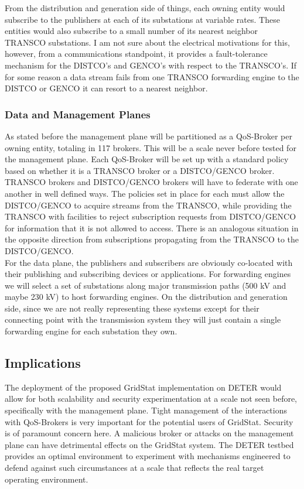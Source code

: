 \documentclass{article}
\begin{document}
From the distribution and generation side of things, each owning entity would subscribe 
to the publishers at each of its substations at variable rates.  These entities would
 also subscribe to a small number of its nearest neighbor TRANSCO substations.  
I am not sure about the electrical motivations for this, however, from a 
communications standpoint, it provides a fault-tolerance mechanism for the DISTCO's 
and GENCO's with respect to the TRANSCO's.  If for some reason a data stream fails 
from one TRANSCO forwarding engine to the DISTCO or GENCO it can resort to a nearest 
neighbor.


\subsubsection{Data and Management Planes}
As stated before the management plane will be partitioned as a QoS-Broker per owning 
entity, totaling in 117 brokers.  This will be a scale never before tested for the
 management plane.  Each QoS-Broker will be set up with a standard policy based on
 whether it is a TRANSCO broker or a DISTCO/GENCO broker.  TRANSCO brokers and 
DISTCO/GENCO brokers will have to federate with one another in well defined ways.  
The policies set in place for each must allow the DISTCO/GENCO to acquire streams 
from the TRANSCO, while providing the TRANSCO with facilities to reject subscription
 requests from DISTCO/GENCO for information that it is not allowed to access.  There 
is an analogous situation in the opposite direction from subscriptions propagating from 
the TRANSCO to the DISTCO/GENCO. \\

For the data plane, the publishers and subscribers are obviously co-located with their
 publishing and subscribing devices or applications.  For forwarding engines we will
 select a set of substations along major transmission paths (500 kV and maybe 230 kV)
 to host forwarding engines.  On the distribution and generation side, since we are not
 really representing these systems except for their connecting point with the 
transmission system they will just contain a single forwarding engine for each 
substation they own.


\subsection{Implications}
The deployment of the proposed GridStat implementation on DETER would allow for both 
scalability and security experimentation at a scale not seen before, specifically with
 the management plane.  Tight management of the interactions with QoS-Brokers is
 very important for the potential users of GridStat. Security is of paramount concern 
here.  A malicious broker or attacks on the management plane can have detrimental 
effects on the GridStat system.  The DETER testbed provides an optimal environment to 
experiment with mechanisms engineered to defend against such circumstances at a scale 
that reflects the real target operating environment. \\
\end{document}
